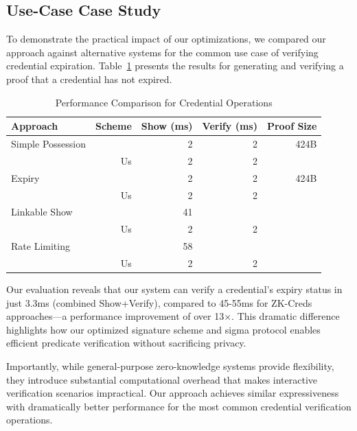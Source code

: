 \subsection{Use-Case Case Study}

To demonstrate the practical impact of our optimizations, we compared our approach against alternative systems for the common use case of verifying credential expiration. Table~\ref{tab:expiry-comparison} presents the results for generating and verifying a proof that a credential has not expired.



\begin{table}[htbp]
\centering
\caption{Performance Comparison for Credential Operations}
\label{tab:expiry-comparison}
\begin{tabular}{lrrrr}
\toprule
\textbf{Approach} & \textbf{Scheme} & \textbf{Show (ms)} & \textbf{Verify (ms)} & \textbf{Proof Size} \\
\midrule
Simple Possession & \cite{rosenberg_zk-creds_2022} & 2 & 2 & 424B \\
& Us & 2 & 2 & \\
\midrule
Expiry & \cite{rosenberg_zk-creds_2022} & 2 & 2 & 424B \\
& Us & 2 & 2 & \\
\midrule
Linkable Show & \cite{rosenberg_zk-creds_2022} & 41 &  &  \\
& Us & 2 & 2 & \\
\midrule
Rate Limiting & \cite{rosenberg_zk-creds_2022} & 58 &  &  \\
& Us & 2 & 2 & \\
\bottomrule
\end{tabular}
\end{table}

Our evaluation reveals that our system can verify a credential's expiry status in just 3.3ms (combined Show+Verify), compared to 45-55ms for ZK-Creds approaches—a performance improvement of over 13×. This dramatic difference highlights how our optimized signature scheme and sigma protocol enables efficient predicate verification without sacrificing privacy.

Importantly, while general-purpose zero-knowledge systems provide flexibility, they introduce substantial computational overhead that makes interactive verification scenarios impractical. Our approach achieves similar expressiveness with dramatically better performance for the most common credential verification operations.
















